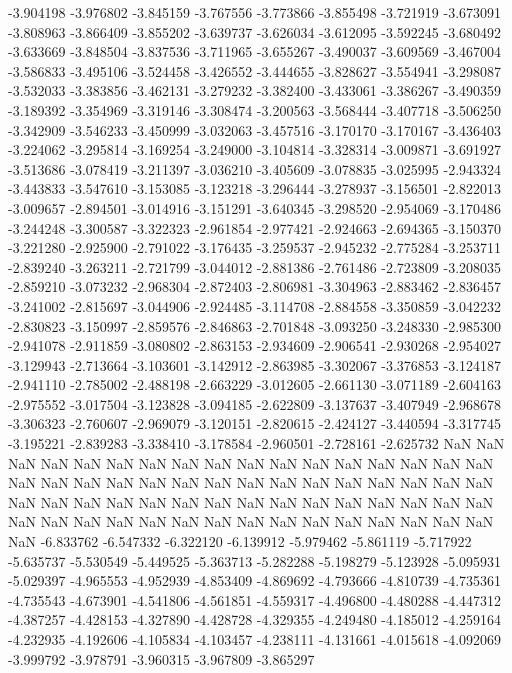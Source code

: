 -3.904198
-3.976802
-3.845159
-3.767556
-3.773866
-3.855498
-3.721919
-3.673091
-3.808963
-3.866409
-3.855202
-3.639737
-3.626034
-3.612095
-3.592245
-3.680492
-3.633669
-3.848504
-3.837536
-3.711965
-3.655267
-3.490037
-3.609569
-3.467004
-3.586833
-3.495106
-3.524458
-3.426552
-3.444655
-3.828627
-3.554941
-3.298087
-3.532033
-3.383856
-3.462131
-3.279232
-3.382400
-3.433061
-3.386267
-3.490359
-3.189392
-3.354969
-3.319146
-3.308474
-3.200563
-3.568444
-3.407718
-3.506250
-3.342909
-3.546233
-3.450999
-3.032063
-3.457516
-3.170170
-3.170167
-3.436403
-3.224062
-3.295814
-3.169254
-3.249000
-3.104814
-3.328314
-3.009871
-3.691927
-3.513686
-3.078419
-3.211397
-3.036210
-3.405609
-3.078835
-3.025995
-2.943324
-3.443833
-3.547610
-3.153085
-3.123218
-3.296444
-3.278937
-3.156501
-2.822013
-3.009657
-2.894501
-3.014916
-3.151291
-3.640345
-3.298520
-2.954069
-3.170486
-3.244248
-3.300587
-3.322323
-2.961854
-2.977421
-2.924663
-2.694365
-3.150370
-3.221280
-2.925900
-2.791022
-3.176435
-3.259537
-2.945232
-2.775284
-3.253711
-2.839240
-3.263211
-2.721799
-3.044012
-2.881386
-2.761486
-2.723809
-3.208035
-2.859210
-3.073232
-2.968304
-2.872403
-2.806981
-3.304963
-2.883462
-2.836457
-3.241002
-2.815697
-3.044906
-2.924485
-3.114708
-2.884558
-3.350859
-3.042232
-2.830823
-3.150997
-2.859576
-2.846863
-2.701848
-3.093250
-3.248330
-2.985300
-2.941078
-2.911859
-3.080802
-2.863153
-2.934609
-2.906541
-2.930268
-2.954027
-3.129943
-2.713664
-3.103601
-3.142912
-2.863985
-3.302067
-3.376853
-3.124187
-2.941110
-2.785002
-2.488198
-2.663229
-3.012605
-2.661130
-3.071189
-2.604163
-2.975552
-3.017504
-3.123828
-3.094185
-2.622809
-3.137637
-3.407949
-2.968678
-3.306323
-2.760607
-2.969079
-3.120151
-2.820615
-2.424127
-3.440594
-3.317745
-3.195221
-2.839283
-3.338410
-3.178584
-2.960501
-2.728161
-2.625732
NaN
NaN
NaN
NaN
NaN
NaN
NaN
NaN
NaN
NaN
NaN
NaN
NaN
NaN
NaN
NaN
NaN
NaN
NaN
NaN
NaN
NaN
NaN
NaN
NaN
NaN
NaN
NaN
NaN
NaN
NaN
NaN
NaN
NaN
NaN
NaN
NaN
NaN
NaN
NaN
NaN
NaN
NaN
NaN
NaN
NaN
NaN
NaN
NaN
NaN
NaN
NaN
NaN
NaN
NaN
NaN
NaN
NaN
NaN
NaN
NaN
NaN
NaN
-6.833762
-6.547332
-6.322120
-6.139912
-5.979462
-5.861119
-5.717922
-5.635737
-5.530549
-5.449525
-5.363713
-5.282288
-5.198279
-5.123928
-5.095931
-5.029397
-4.965553
-4.952939
-4.853409
-4.869692
-4.793666
-4.810739
-4.735361
-4.735543
-4.673901
-4.541806
-4.561851
-4.559317
-4.496800
-4.480288
-4.447312
-4.387257
-4.428153
-4.327890
-4.428728
-4.329355
-4.249480
-4.185012
-4.259164
-4.232935
-4.192606
-4.105834
-4.103457
-4.238111
-4.131661
-4.015618
-4.092069
-3.999792
-3.978791
-3.960315
-3.967809
-3.865297
